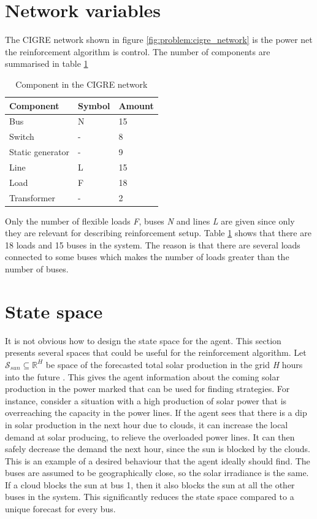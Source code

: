 \documentclass[class=book, crop=false]{standalone}
\begin{document}
\section{Network variables}
The CIGRE network shown in figure \ref{fig:problem:cigre_network} is the power net the reinforcement algorithm is control. The number of components are summarised in table \ref{table:cigre_components}

\begin{table}[ht]
\centering
\caption{Component in the CIGRE network}
\label{table:cigre_components}
\begin{tabular}{l|ll}

Component  & Symbol & Amount 
\\ 
\hline
Bus & N & 15 \\
Switch & - & 8 \\
Static generator &-& 9 \\ 
Line & L & 15 \\
Load &F & 18 \\
Transformer &- & 2

 \\
\hline
\end{tabular}
\end{table}
Only the number of flexible loads \textit{F}, buses \textit{N} and lines \textit{L} are given since only they are relevant for describing reinforcement setup. Table \ref{table:cigre_components} shows that there are 18 loads and 15 buses in the system. The reason is that there are several loads connected to some buses which makes the number of loads greater than the number of buses.  



\section{State space}
It is not obvious how to design the state space for the agent. This section presents several spaces that could be useful for the reinforcement algorithm. Let $\mathcal{S}_{sun} \subseteq  \mathbb{R}^{H}$ be space of the forecasted total solar production in the grid \textit{H} hours into the future . This gives the agent information about the coming solar production in the power marked that can be used for finding strategies. For instance, consider a situation with a high production of solar power that is overreaching the capacity in the power lines. If the agent sees that there is a dip in solar production in the next hour due to clouds, it can increase the local demand at solar producing, to relieve the overloaded power lines. It can then safely decrease the demand the next hour, since the sun is blocked by the clouds. This is an example of a desired behaviour that the agent ideally should find. The buses are assumed to be geographically close, so the solar irradiance is the same. If a cloud blocks the sun at bus 1, then it also blocks the sun at all the other buses in the system. This significantly reduces the state space compared to a unique forecast for every bus. 
\end{document}
